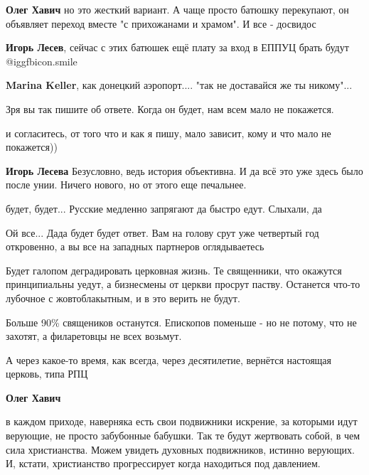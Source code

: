 \begin{itemize}
\begin{itemize}
\textbf{Олег Хавич} но это жесткий вариант. А чаще просто батюшку перекупают, он объявляет переход вместе "с прихожанами и храмом". И все - досвидос

\textbf{Игорь Лесев}, сейчас с этих батюшек ещё плату за вход в ЕППУЦ брать будут  @igg{fbicon.smile} 

\textbf{Marina Keller}, как донецкий аэропорт.... "так не доставайся же ты никому"...

\end{itemize} %

Зря вы так пишите об ответе. Когда он будет, нам всем мало не покажется.

\begin{itemize} %
и согласитесь, от того что и как я пишу, мало зависит, кому и что мало не покажется))

\textbf{Игорь Лесева} Безусловно, ведь история объективна. И да всё это уже здесь было после унии. Ничего нового, но от этого еще печальнее.

будет, будет... Русские медленно запрягают да быстро едут. Слыхали, да

Ой все...
Дада будет будет ответ.
Вам на голову срут уже четвертый год откровенно, а вы все на западных партнеров оглядываетесь
\end{itemize} %


Будет галопом деградировать церковная жизнь. Те священники, что окажутся
принципиальны уедут, а бизнесмены от церкви просрут паству. Останется что-то
лубочное с жовтоблакытным, и в это верить не будут.

\begin{itemize} %
Больше 90\% священиков останутся. Епископов поменьше - но не потому, что не захотят, а филаретовцы не всех возьмут.

А через какое-то время, как всегда, через десятилетие, вернётся настоящая церковь, типа РПЦ

\textbf{Олег Хавич} 

в каждом приходе, наверняка есть свои подвижники искрение, за которыми идут
верующие, не просто забубонные бабушки. Так те будут жертвовать собой, в чем
сила христианства. Можем увидеть духовных подвижников, истинно верующих. И,
кстати, христианство прогрессирует когда находиться под давлением.


\end{itemize}
\end{itemize}
